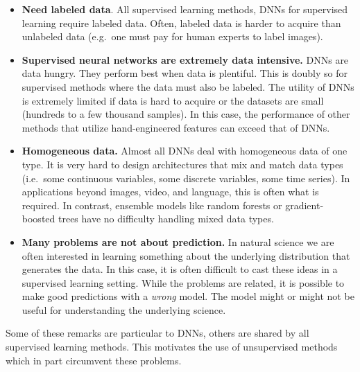 \begin{itemize}
\item \textbf{Need labeled data}. All supervised learning methods, DNNs for supervised learning require labeled data. Often, labeled data is harder to acquire than unlabeled data (e.g.~one must pay for human experts to label images).

\item \textbf{Supervised neural networks are extremely data intensive.} DNNs are data hungry. They perform best when data is plentiful. This is doubly so for supervised methods where the data must also be labeled. The utility of DNNs is extremely limited if data is hard to acquire or the datasets are small (hundreds to a few thousand samples). In this case, the performance of other methods that utilize hand-engineered features can exceed that of DNNs.

\item \textbf{Homogeneous data.} Almost all DNNs deal with homogeneous data of one type. It is very hard to design architectures that mix and match data types (i.e.~some continuous variables, some discrete variables, some time series). In applications beyond images, video, and language, this is often what is required. In contrast, ensemble models like random forests or gradient-boosted trees have no difficulty handling mixed data types.

\item \textbf{Many problems are not about prediction.} In natural science we are often interested in learning something about the underlying distribution that generates the data. In this case, it is often difficult to cast these ideas in a supervised learning setting. While the problems are related, it is possible to make good predictions with a \emph{wrong} model. The model might or might not be useful for understanding the underlying science.
\end{itemize}

\noindent
Some of these remarks are particular to DNNs, others are shared by all supervised learning methods. This motivates the use of unsupervised methods which in part circumvent these problems.


